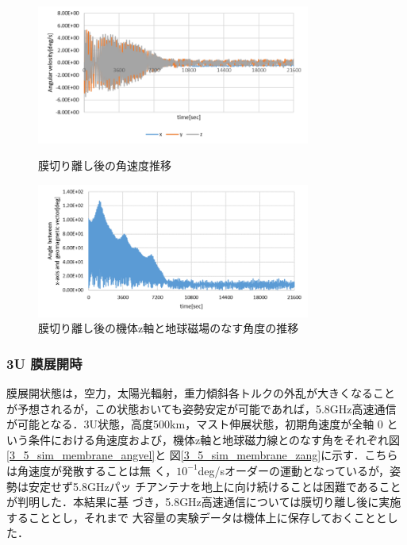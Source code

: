 \begin{figure}[htbp]
	\centering
	\includegraphics[width=9cm]{./03/fig/3_5_sim_2u_angvel.png}
	\caption{膜切り離し後の角速度推移}
	\label{3_5_sim_2u_angvel}
	\centering
	\includegraphics[width=9cm]{./03/fig/3_5_sim_2u_zang.png}
	\caption{膜切り離し後の機体z軸と地球磁場のなす角度の推移}
	\label{3_5_sim_2u_zang}
\end{figure}

\subsubsection{3U 膜展開時}
膜展開状態は，空力，太陽光輻射，重力傾斜各トルクの外乱が大きくなること
が予想されるが，この状態おいても姿勢安定が可能であれば，5.8GHz高速通信
が可能となる．3U状態，高度500km，マスト伸展状態，初期角速度が全軸 0 という条件における角速度および，機体z軸と地球磁力線とのなす角をそれぞれ図\ref{3_5_sim_membrane_angvel}と
図\ref{3_5_sim_membrane_zang}に示す．こちらは角速度が発散することは無
く，$10^{-1}$deg/sオーダーの運動となっているが，姿勢は安定せず5.8GHzパッ
チアンテナを地上に向け続けることは困難であることが判明した．本結果に基
づき，5.8GHz高速通信については膜切り離し後に実施することとし，それまで
大容量の実験データは機体上に保存しておくこととした．

